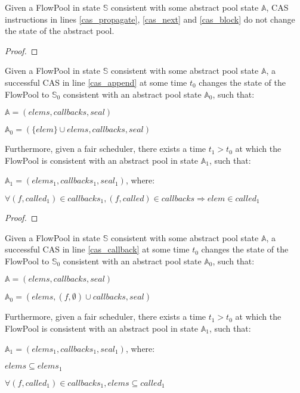 \documentclass[runningheads,a4paper]{llncs}
\begin{document}
\begin{lemma}[Housekeeping]
Given a FlowPool in state $\mathbb{S}$ consistent with some abstract
pool state $\mathbb{A}$, CAS instructions in lines \ref{cas_propagate}, \ref{cas_next} and
\ref{cas_block} do not change the state of the abstract pool.
\end{lemma}

\begin{proof}
\end{proof}


\begin{lemma}\label{lemma-append}
Given a FlowPool in state $\mathbb{S}$ consistent with some abstract pool state $\mathbb{A}$, 
a successful CAS in line \ref{cas_append} at some time $t_0$ changes the state of the FlowPool 
to $\mathbb{S}_0$ consistent with an abstract pool state $\mathbb{A}_0$, such that:

$\mathbb{A} = (elems, callbacks, seal)$

$\mathbb{A}_0 = (\{elem\} \cup elems, callbacks, seal)$

Furthermore, given a fair scheduler, there exists a time $t_1 > t_0$ at which the FlowPool 
is consistent with an abstract pool in state $\mathbb{A}_1$, such that:

$\mathbb{A}_1 = (elems_1, callbacks_1, seal_1)$, where:

$\forall (f, called_1) \in callbacks_1, (f, called) \in callbacks \Rightarrow elem \in called_1$
\end{lemma}

\begin{proof}
\end{proof}


\begin{lemma}\label{lemma-foreach}
Given a FlowPool in state $\mathbb{S}$ consistent with some abstract pool state $\mathbb{A}$, 
a successful CAS in line \ref{cas_callback} at some time $t_0$ changes the state of the FlowPool 
to $\mathbb{S}_0$ consistent with an abstract pool state $\mathbb{A}_0$, such that:

$\mathbb{A} = (elems, callbacks, seal)$

$\mathbb{A}_0 = (elems, (f, \emptyset) \cup callbacks, seal)$

Furthermore, given a fair scheduler, there exists a time $t_1 > t_0$ at which the FlowPool 
is consistent with an abstract pool in state $\mathbb{A}_1$, such that:

$\mathbb{A}_1 = (elems_1, callbacks_1, seal_1)$, where:

$elems \subseteq elems_1$

$\forall (f, called_1) \in callbacks_1, elems \subseteq called_1$
\end{lemma}
\end{document}

